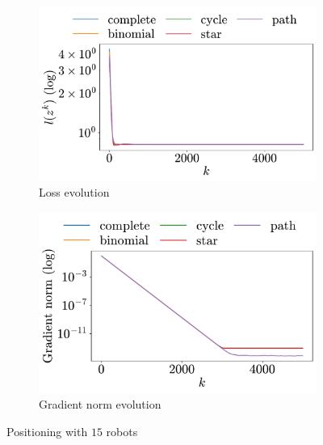 \documentclass[a4paper,11pt,oneside]{book}
\begin{document}
\begin{figure}[h!]
      \centering
      \begin{subfigure}[h]{0.43\linewidth}
            \centering
            \includegraphics[width=\linewidth]{./figs/aggregative/more_agents/loss.pdf} 
            \caption{Loss evolution}
      \end{subfigure}
      \hfill
      \begin{subfigure}[h]{0.43\linewidth}
            \centering
            \includegraphics[width=\linewidth]{./figs/aggregative/more_agents/gradient.pdf} 
            \caption{Gradient norm evolution}
      \end{subfigure}
      \caption{Positioning with $15$ robots}
      \label{fig:positioning_15}
\end{figure}
\end{document}
